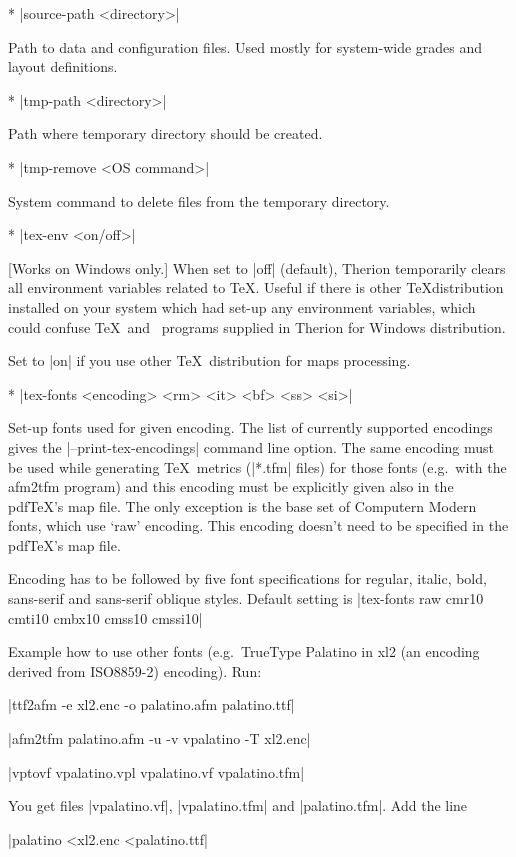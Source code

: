 * |source-path <directory>| 

  Path to data and configuration files. Used mostly for system-wide grades and 
  layout definitions.

* |tmp-path <directory>| 

  Path where temporary directory should be created.
  
* |tmp-remove <OS command>| 

  System command to delete files from the temporary directory.

* |tex-env <on/off>| 

  [Works on Windows only.]
  When set to |off| (default), Therion temporarily clears all environment 
  variables related to \TeX. Useful if there is other \TeX distribution
  installed on your system which had set-up any environment variables,
  which could confuse \TeX\ and \MP\ programs supplied in Therion for Windows
  distribution. 
  
  Set to |on| if you use other \TeX\ distribution for maps processing.

* |tex-fonts <encoding> <rm> <it> <bf> <ss> <si>|
        
  Set-up fonts used for given encoding. The list of currently supported 
  encodings gives the |--print-tex-encodings| command line option.   
  The same encoding must be used while generating \TeX\ metrics (|*.tfm| files) 
  for those fonts (e.g.~with the afm2tfm program) and this encoding must be
  explicitly given also in the pdf\TeX's map file. The only exception is the 
  base set of Computern Modern fonts, which use `raw' encoding. This encoding
  doesn't need to be specified in the pdf\TeX's map file.
  
  Encoding has to be followed by five font specifications for regular, italic,
  bold, sans-serif and sans-serif oblique styles.
  Default setting is |tex-fonts raw cmr10 cmti10 cmbx10 cmss10 cmssi10|
  
  Example how to use other fonts (e.g.~TrueType Palatino in xl2 (an encoding 
  derived from ISO8859-2) encoding). Run:
  
  |ttf2afm -e xl2.enc -o palatino.afm palatino.ttf|
  
  |afm2tfm palatino.afm -u -v vpalatino -T xl2.enc|

  |vptovf vpalatino.vpl vpalatino.vf vpalatino.tfm|
  
  You get files |vpalatino.vf|, |vpalatino.tfm| and |palatino.tfm|. Add the line 
  
  |palatino <xl2.enc <palatino.ttf|
  
